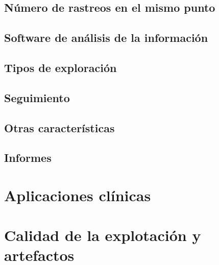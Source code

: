 \subsection{Número de rastreos en el mismo punto}

\subsection{Software de análisis de la información}

\subsection{Tipos de exploración}

\subsection{Seguimiento}

\subsection{Otras características}

\subsection{Informes}

\section{Aplicaciones clínicas}

\section{Calidad de la explotación y artefactos}
